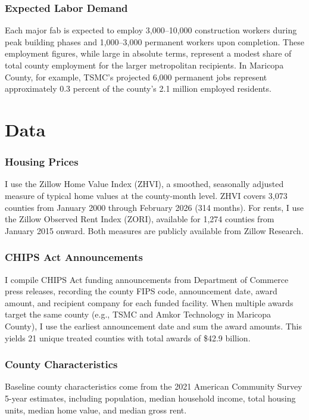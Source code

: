 \documentclass[12pt]{article}
\begin{document}
\subsubsection*{Expected Labor Demand} Each major fab is expected to employ 3,000--10,000 construction workers during peak building phases and 1,000--3,000 permanent workers upon completion. These employment figures, while large in absolute terms, represent a modest share of total county employment for the larger metropolitan recipients. In Maricopa County, for example, TSMC's projected 6,000 permanent jobs represent approximately 0.3 percent of the county's 2.1 million employed residents.

\section{Data}
\label{sec:data}

\subsubsection*{Housing Prices} I use the Zillow Home Value Index (ZHVI), a smoothed, seasonally adjusted measure of typical home values at the county-month level. ZHVI covers 3,073 counties from January 2000 through February 2026 (314 months). For rents, I use the Zillow Observed Rent Index (ZORI), available for 1,274 counties from January 2015 onward. Both measures are publicly available from Zillow Research.

\subsubsection*{CHIPS Act Announcements} I compile CHIPS Act funding announcements from Department of Commerce press releases, recording the county FIPS code, announcement date, award amount, and recipient company for each funded facility. When multiple awards target the same county (e.g., TSMC and Amkor Technology in Maricopa County), I use the earliest announcement date and sum the award amounts. This yields 21 unique treated counties with total awards of \$42.9 billion.

\subsubsection*{County Characteristics} Baseline county characteristics come from the 2021 American Community Survey 5-year estimates, including population, median household income, total housing units, median home value, and median gross rent.
\end{document}
